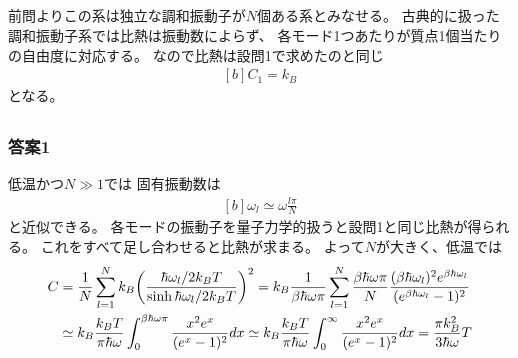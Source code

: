 \documentclass[../../sp_2015.tex]{subfiles}
\begin{document}
\subsection{}
前問よりこの系は独立な調和振動子が\(N\)個ある系とみなせる。
古典的に扱った調和振動子系では比熱は振動数によらず、
各モード1つあたりが質点1個当たりの自由度に対応する。
なので比熱は設問1で求めたのと同じ
\begin{equation}\begin{aligned}[b]
    C_1 = k_B
\end{aligned}\end{equation}
となる。

\subsection{}
\subsubsection{答案1}
低温かつ\(N\gg1\)では
固有振動数は
\begin{equation}\begin{aligned}[b]
    \omega_l \simeq \omega \frac{l\pi}{N}
\end{aligned}\end{equation}
と近似できる。
各モードの振動子を量子力学的扱うと設問1と同じ比熱が得られる。
これをすべて足し合わせると比熱が求まる。
よって\(N\)が大きく、低温では
\begin{equation}\begin{aligned}[b]
    C &= \frac{1}{N}\sum_{l=1}^{N} k_B \qty(\frac{\hbar\omega_l/2k_BT}{\sinh\hbar\omega_l/2k_BT})^2
    = k_B\frac{1}{\beta\hbar\omega \pi}\sum_{l=1}^{N}\frac{\beta\hbar\omega\pi}{N}\frac{(\beta\hbar \omega_l)^2e^{\beta\hbar\omega_l}}{(e^{\beta\hbar\omega_l}-1)^2}\\
    &\simeq k_B \frac{k_BT}{\pi\hbar\omega}\int_{0}^{\beta\hbar\omega\pi}\frac{x^2e^x}{(e^x-1)^2}dx
    \simeq k_B \frac{k_BT}{\pi\hbar\omega}\int_{0}^{\infty}\frac{x^2e^x}{(e^x-1)^2}dx
    = \frac{\pi k_B^2}{3\hbar\omega}T
\end{aligned}\end{equation}
\end{document}
